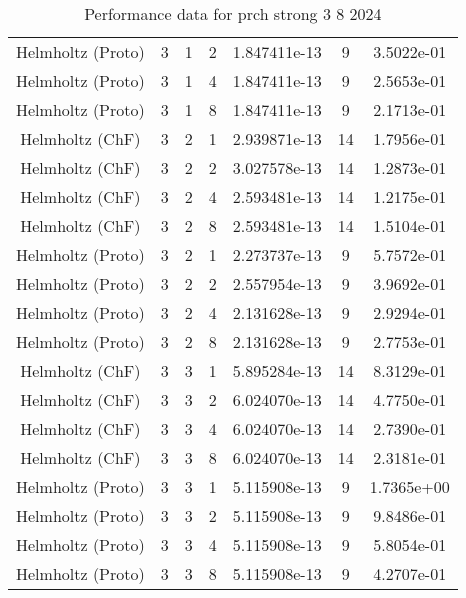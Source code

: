 \documentclass{article}
\begin{document}
\begin{small}
\begin{table}
\begin{center}
\begin{tabular}{|c|c|c|c|c|c||c|}
        Helmholtz     (Proto) & 3 & 1 & 2& 1.847411e-13 & 9 & 3.5022e-01\\
        Helmholtz     (Proto) & 3 & 1 & 4& 1.847411e-13 & 9 & 2.5653e-01\\
        Helmholtz     (Proto) & 3 & 1 & 8& 1.847411e-13 & 9 & 2.1713e-01\\
        \hline 
        Helmholtz       (ChF) & 3 & 2 & 1& 2.939871e-13 & 14 & 1.7956e-01\\
        Helmholtz       (ChF) & 3 & 2 & 2& 3.027578e-13 & 14 & 1.2873e-01\\
        Helmholtz       (ChF) & 3 & 2 & 4& 2.593481e-13 & 14 & 1.2175e-01\\
        Helmholtz       (ChF) & 3 & 2 & 8& 2.593481e-13 & 14 & 1.5104e-01\\
        Helmholtz     (Proto) & 3 & 2 & 1& 2.273737e-13 & 9 & 5.7572e-01\\
        Helmholtz     (Proto) & 3 & 2 & 2& 2.557954e-13 & 9 & 3.9692e-01\\
        Helmholtz     (Proto) & 3 & 2 & 4& 2.131628e-13 & 9 & 2.9294e-01\\
        Helmholtz     (Proto) & 3 & 2 & 8& 2.131628e-13 & 9 & 2.7753e-01\\
        \hline 
        Helmholtz       (ChF) & 3 & 3 & 1& 5.895284e-13 & 14 & 8.3129e-01\\
        Helmholtz       (ChF) & 3 & 3 & 2& 6.024070e-13 & 14 & 4.7750e-01\\
        Helmholtz       (ChF) & 3 & 3 & 4& 6.024070e-13 & 14 & 2.7390e-01\\
        Helmholtz       (ChF) & 3 & 3 & 8& 6.024070e-13 & 14 & 2.3181e-01\\
        Helmholtz     (Proto) & 3 & 3 & 1& 5.115908e-13 & 9 & 1.7365e+00\\
        Helmholtz     (Proto) & 3 & 3 & 2& 5.115908e-13 & 9 & 9.8486e-01\\
        Helmholtz     (Proto) & 3 & 3 & 4& 5.115908e-13 & 9 & 5.8054e-01\\
        Helmholtz     (Proto) & 3 & 3 & 8& 5.115908e-13 & 9 & 4.2707e-01\\
        \hline 
      \end{tabular} 
    \end{center}   
    \caption{Performance data for  prch strong 3 8 2024} 
  \end{table} 
\end{small}
\end{document}

